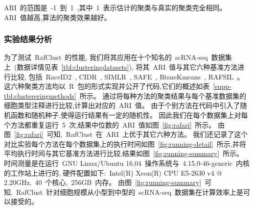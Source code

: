 ARI~的范围是~-1~到~1~,其中~1~表示估计的聚类与真实的聚类完全相同。
ARI~值越高,算法的聚类效果越好。

\subsubsection{实验结果分析}

为了测试~RafClust~的性能,
我们将其应用在十个知名的~scRNA-seq~数据集上~(数据详情见表~\ref{tbl:clusteringdatasets}),
将其~ARI~值与其它六种基准方法进行比较,
包括~RaceID2~\cite{grun2016novo}, CIDR~\cite{lin2017cidr}, SIMLR~\cite{wang2018simlr}, SAFE~\cite{yang2018safe}, RtsneKmeans~\cite{hartigan1979algorithm,maaten2008visualizing,van2014accelerating}, RAFSIL~\cite{pouyan2018random}。
这六种聚类方法均以~R~包的形式实现并公开了代码,它们的概述如表~\ref{supp-tbl:clustereringmethods}~所示。
通过将每种方法的聚类结果与每个基准数据集的细胞类型注释进行比较,计算出对应的~ARI~值。 
由于个别方法在代码中引入了随机函数和随机种子,使得运行结果有一定的随机性。
因此我们在每个数据集上对每个方法都重复运行~5~次,结果中位数的~ARI~值如图~\ref{fig:rafari}~所示。
由图~\ref{fig:rafari}~可知,~RafClust~在~ARI~上优于其它六种方法。
我们还记录了这个对比实验每个方法在每个数据集上的执行时间如图~\ref{fig:running-detail}~所示,并将平均执行时间与其它基准方法进行比较,结果如图~\ref{fig:running-summary}~所示。
时间测量是在运行~GNU Linux/Ubuntu 16.04~操作系统与~4.15.0-46-generic~内核的工作站上进行的,
硬件配置如下:~Intel(R) Xeon(R) CPU E5-2630 v4 @ 2.20GHz,~40~个核心,~256GB~内存。
由图~\ref{fig:running-summary}~可知,~RafClust~针对细胞规模从小型到中型的~scRNA-seq~数据集在计算效率上是可以接受的。

